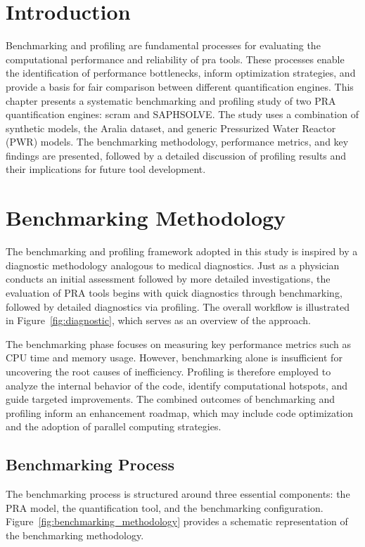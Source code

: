 

\section{Introduction}
Benchmarking and profiling are fundamental processes for evaluating the computational performance and reliability of \acrshort{pra} tools. These processes enable the identification of performance bottlenecks, inform optimization strategies, and provide a basis for fair comparison between different quantification engines. This chapter presents a systematic benchmarking and profiling study of two PRA quantification engines: scram and SAPHSOLVE. The study uses a combination of synthetic models, the Aralia dataset, and generic Pressurized Water Reactor (PWR) models. The benchmarking methodology, performance metrics, and key findings are presented, followed by a detailed discussion of profiling results and their implications for future tool development.

\section{Benchmarking Methodology}
The benchmarking and profiling framework adopted in this study is inspired by a diagnostic methodology analogous to medical diagnostics. Just as a physician conducts an initial assessment followed by more detailed investigations, the evaluation of PRA tools begins with quick diagnostics through benchmarking, followed by detailed diagnostics via profiling. The overall workflow is illustrated in Figure~\ref{fig:diagnostic}, which serves as an overview of the approach.



The benchmarking phase focuses on measuring key performance metrics such as CPU time and memory usage. However, benchmarking alone is insufficient for uncovering the root causes of inefficiency. Profiling is therefore employed to analyze the internal behavior of the code, identify computational hotspots, and guide targeted improvements. The combined outcomes of benchmarking and profiling inform an enhancement roadmap, which may include code optimization and the adoption of parallel computing strategies.

\subsection{Benchmarking Process}
The benchmarking process is structured around three essential components: the PRA model, the quantification tool, and the benchmarking configuration. Figure~\ref{fig:benchmarking_methodology} provides a schematic representation of the benchmarking methodology.

